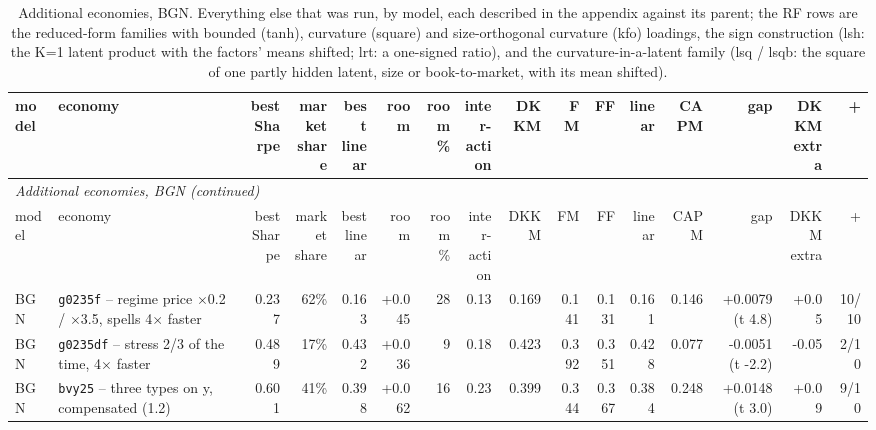 \begin{landscape}\footnotesize\setlength{\tabcolsep}{2pt}
\begin{longtable}{lp{4.6cm}rrrrrrrrrrrrrr}
\caption{Additional economies, BGN. Everything else that was run, by model, each described in the appendix against its parent; the RF rows are the reduced-form families with bounded (tanh), curvature (square) and size-orthogonal curvature (kfo) loadings, the sign construction (lsh: the K=1 latent product with the factors' means shifted; lrt: a one-signed ratio), and the curvature-in-a-latent family (lsq / lsqb: the square of one partly hidden latent, size or book-to-market, with its mean shifted).}\label{tab:xa-bgn}\\\hline
model & economy & \shortstack[r]{best\\Sharpe} & \shortstack[r]{market\\share} & \shortstack[r]{best\\linear} & room & \shortstack[r]{room\\\%} & \shortstack[r]{inter-\\action} & DKKM & FM & FF & linear & CAPM & gap & \shortstack[r]{DKKM\\extra} & + \\\hline\endfirsthead
\multicolumn{16}{l}{\textit{Additional economies, BGN (continued)}}\\\hline
model & economy & \shortstack[r]{best\\Sharpe} & \shortstack[r]{market\\share} & \shortstack[r]{best\\linear} & room & \shortstack[r]{room\\\%} & \shortstack[r]{inter-\\action} & DKKM & FM & FF & linear & CAPM & gap & \shortstack[r]{DKKM\\extra} & + \\\hline\endhead
\hline\endfoot
BGN & \texttt{g0235f} -- regime price $\times$0.2 / $\times$3.5, spells 4$\times$ faster & 0.237 & 62\% & 0.163 & +0.045 & 28 & 0.13 & 0.169 & 0.141 & 0.131 & 0.161 & 0.146 & +0.0079 (t 4.8) & +0.05 & 10/10 \\
BGN & \texttt{g0235df} -- stress 2/3 of the time, 4$\times$ faster & 0.489 & 17\% & 0.432 & +0.036 & 9 & 0.18 & 0.423 & 0.392 & 0.351 & 0.428 & 0.077 & -0.0051 (t -2.2) & -0.05 & 2/10 \\
BGN & \texttt{bvy25} -- three types on y, compensated (1.2) & 0.601 & 41\% & 0.398 & +0.062 & 16 & 0.23 & 0.399 & 0.344 & 0.367 & 0.384 & 0.248 & +0.0148 (t 3.0) & +0.09 & 9/10 \\

\end{longtable}
\end{landscape}
